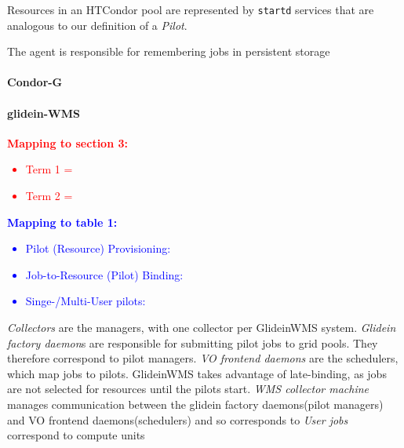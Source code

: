 \documentclass{sig-alternate}
\begin{document}
Resources in an HTCondor pool are represented by \texttt{startd} services
that are analogous to our definition of a \textit{Pilot}. 





The agent is responsible for remembering jobs
in persistent storage

\paragraph{Condor-G}

\paragraph{glidein-WMS}


\textcolor{red}
{
\textbf{Mapping to section 3:}
\begin{itemize}
\item Term 1 =
\item Term 2 =
\end{itemize}
}

\textcolor{blue}
{
\textbf{Mapping to table 1:}
\begin{itemize}
\item Pilot (Resource) Provisioning:
\item Job-to-Resource (Pilot) Binding:
\item Singe-/Multi-User pilots:
\end{itemize}
}

\textit{Collectors} are the managers, with one collector per
GlideinWMS system.
\textit{Glidein factory daemon}s are responsible for
submitting pilot jobs to grid pools.
They therefore correspond to pilot managers.
\textit{VO frontend daemons} are the schedulers, which map jobs
to pilots.  GlideinWMS takes advantage of late-binding, as
jobs are not selected for resources until the pilots start.
\textit{WMS collector machine} manages communication between the glidein
factory daemons(pilot managers) and VO frontend daemons(schedulers)
and so corresponds to 
\textit{User jobs} correspond to compute units 
\end{document}
